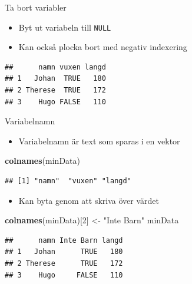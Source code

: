 \documentclass[
  11pt,
  ignorenonframetext,
]{beamer}
\newenvironment{Shaded}{\begin{snugshade}}{\end{snugshade}}
\newcommand{\DecValTok}[1]{\textcolor[rgb]{0.00,0.00,0.81}{#1}}
\newcommand{\KeywordTok}[1]{\textcolor[rgb]{0.13,0.29,0.53}{\textbf{#1}}}
\newcommand{\NormalTok}[1]{#1}
\newcommand{\OperatorTok}[1]{\textcolor[rgb]{0.81,0.36,0.00}{\textbf{#1}}}
\newcommand{\OtherTok}[1]{\textcolor[rgb]{0.56,0.35,0.01}{#1}}
\newcommand{\StringTok}[1]{\textcolor[rgb]{0.31,0.60,0.02}{#1}}
\providecommand{\tightlist}{%
  \setlength{\itemsep}{0pt}\setlength{\parskip}{0pt}}
\begin{document}

\begin{frame}[fragile]{Ta bort variabler}
\protect\hypertarget{ta-bort-variabler}{}
\begin{itemize}
\tightlist
\item
  Byt ut variabeln till \texttt{NULL}
\item
  Kan också plocka bort med negativ indexering
\end{itemize}

\begin{Shaded}
\end{Shaded}

\begin{verbatim}
##      namn vuxen langd
## 1   Johan  TRUE   180
## 2 Therese  TRUE   172
## 3    Hugo FALSE   110
\end{verbatim}
\end{frame}


\begin{frame}[fragile]{Variabelnamn}
\protect\hypertarget{variabelnamn}{}
\begin{itemize}
\tightlist
\item
  Variabelnamn är text som sparas i en vektor
\end{itemize}

\begin{Shaded}
\begin{Highlighting}[]
\KeywordTok{colnames}\NormalTok{(minData)}
\end{Highlighting}
\end{Shaded}

\begin{verbatim}
## [1] "namn"  "vuxen" "langd"
\end{verbatim}

\pause

\begin{itemize}
\tightlist
\item
  Kan byta genom att skriva över värdet
\end{itemize}

\begin{Shaded}
\begin{Highlighting}[]
\KeywordTok{colnames}\NormalTok{(minData)[}\DecValTok{2}\NormalTok{] \textless{}{-}}\StringTok{ "Inte Barn"}
\NormalTok{minData}
\end{Highlighting}
\end{Shaded}

\begin{verbatim}
##      namn Inte Barn langd
## 1   Johan      TRUE   180
## 2 Therese      TRUE   172
## 3    Hugo     FALSE   110
\end{verbatim}
\end{frame}
\end{document}
